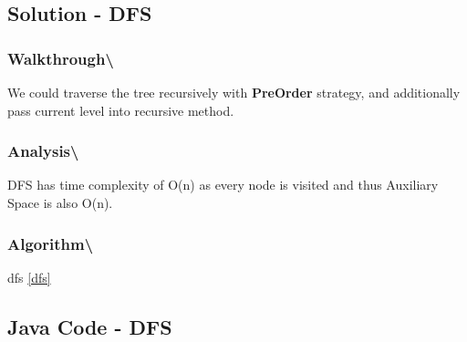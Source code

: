\documentclass[]{book}
\begin{document}
\hypertarget{solution---dfs-3}{%
\subsection{Solution - DFS}\label{solution---dfs-3}}

\hypertarget{walkthrough-56}{%
\subsubsection{Walkthrough\textbackslash{}}\label{walkthrough-56}}

We could traverse the tree recursively with \textbf{PreOrder} strategy, and additionally pass current level
into recursive method.

\hypertarget{analysis-63}{%
\subsubsection{Analysis\textbackslash{}}\label{analysis-63}}

DFS has time complexity of O(n) as every node is visited and thus Auxiliary Space is also O(n).

\hypertarget{algorithm-65}{%
\subsubsection{Algorithm\textbackslash{}}\label{algorithm-65}}

dfs \ref{dfs}

\hypertarget{java-code---dfs-4}{%
\subsection{Java Code - DFS}\label{java-code---dfs-4}}
\end{document}
